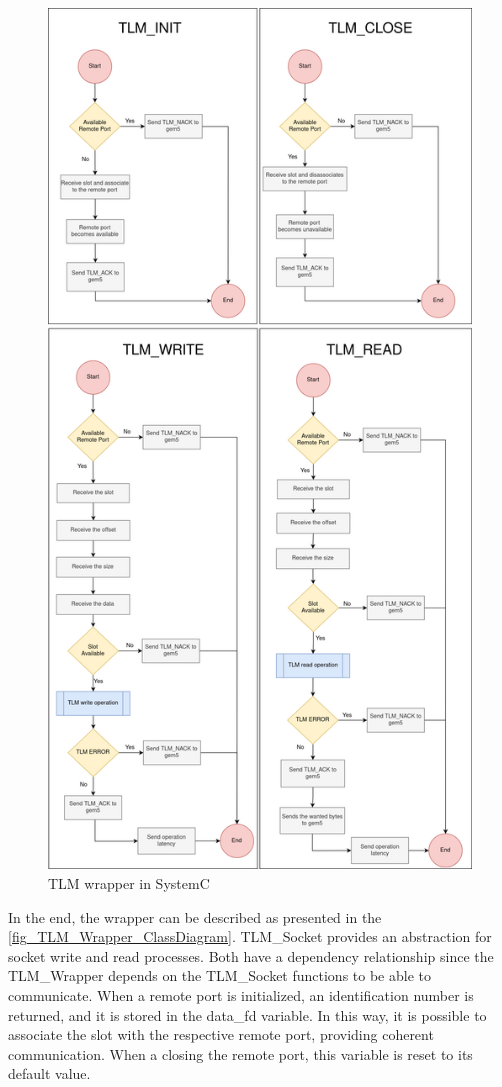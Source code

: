 \begin{figure}[H]
	\centering
 	\includegraphics[width=0.7\linewidth]{Images/TLMWrapper_SystemC.png} 
 	\caption{TLM wrapper in SystemC}
\end{figure}

In the end, the wrapper can be described as presented in the \autoref{fig_TLM_Wrapper_ClassDiagram}. TLM\_Socket provides an abstraction 
for socket write and read processes. Both have a dependency relationship since the TLM\_Wrapper depends on the TLM\_Socket functions to 
be able to communicate. When a remote port is initialized, an identification number is returned, and it is stored in the data\_fd variable. 
In this way, it is possible to associate the slot with the respective remote port, providing coherent communication. When a closing 
the remote port, this variable is reset to its default value. 

